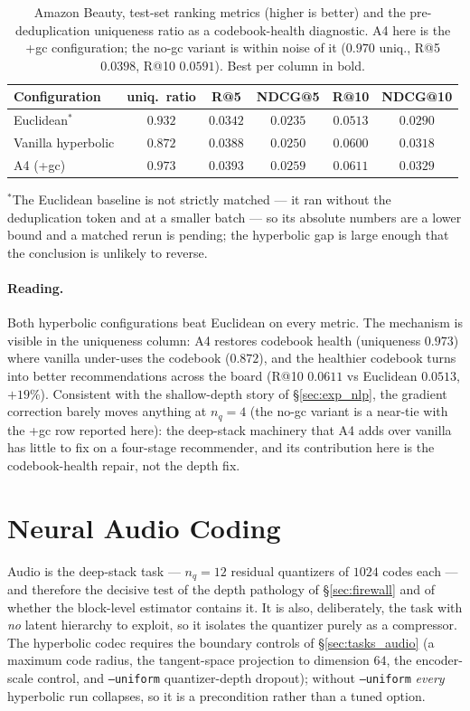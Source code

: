 \documentclass[12pt]{report}
\begin{document}
\begin{table}[h]
\centering
\caption{Amazon Beauty, test-set ranking metrics (higher is better) and the pre-deduplication uniqueness ratio as a codebook-health diagnostic. A4 here is the +gc configuration; the no-gc variant is within noise of it ($0.970$ uniq., R@5 $0.0398$, R@10 $0.0591$). Best per column in bold.}
\label{tab:rec_beauty}
\begin{tabular}{lccccc}
\hline
Configuration & uniq.\ ratio & R@5 & NDCG@5 & R@10 & NDCG@10 \\
\hline
Euclidean$^\ast$ & $0.932$ & $0.0342$ & $0.0235$ & $0.0513$ & $0.0290$ \\
Vanilla hyperbolic & $0.872$ & $0.0388$ & $0.0250$ & $0.0600$ & $0.0318$ \\
A4 (+gc) & $\mathbf{0.973}$ & $\mathbf{0.0393}$ & $\mathbf{0.0259}$ & $\mathbf{0.0611}$ & $\mathbf{0.0329}$ \\
\hline
\end{tabular}
\end{table}

{\small $^\ast$The Euclidean baseline is not strictly matched --- it ran without the deduplication token and at a smaller batch --- so its absolute numbers are a lower bound and a matched rerun is pending; the hyperbolic gap is large enough that the conclusion is unlikely to reverse.}

\paragraph{Reading.} Both hyperbolic configurations beat Euclidean on every metric. The mechanism is visible in the uniqueness column: A4 restores codebook health (uniqueness $0.973$) where vanilla under-uses the codebook ($0.872$), and the healthier codebook turns into better recommendations across the board (R@10 $0.0611$ vs Euclidean $0.0513$, $+19\%$). Consistent with the shallow-depth story of \S\ref{sec:exp_nlp}, the gradient correction barely moves anything at $n_q=4$ (the no-gc variant is a near-tie with the +gc row reported here): the deep-stack machinery that A4 adds over vanilla has little to fix on a four-stage recommender, and its contribution here is the codebook-health repair, not the depth fix.

\section{Neural Audio Coding}
\label{sec:exp_audio}

Audio is the deep-stack task --- $n_q=12$ residual quantizers of $1024$ codes each --- and therefore the decisive test of the depth pathology of \S\ref{sec:firewall} and of whether the block-level estimator contains it. It is also, deliberately, the task with \emph{no} latent hierarchy to exploit, so it isolates the quantizer purely as a compressor. The hyperbolic codec requires the boundary controls of \S\ref{sec:tasks_audio} (a maximum code radius, the tangent-space projection to dimension $64$, the encoder-scale control, and \texttt{--uniform} quantizer-depth dropout); without \texttt{--uniform} \emph{every} hyperbolic run collapses, so it is a precondition rather than a tuned option.
\end{document}
